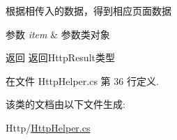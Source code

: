 根据相传入的数据，得到相应页面数据 


\begin{DoxyParams}{参数}
{\em item} & 参数类对象\\
\hline
\end{DoxyParams}
\begin{DoxyReturn}{返回}
返回\-Http\-Result类型
\end{DoxyReturn}


在文件 Http\-Helper.\-cs 第 36 行定义.



该类的文档由以下文件生成\-:\begin{DoxyCompactItemize}
\item 
Http/\hyperlink{_http_helper_8cs}{Http\-Helper.\-cs}\end{DoxyCompactItemize}
